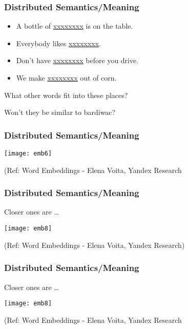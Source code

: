 \begin{frame}[fragile]\frametitle{Distributed Semantics/Meaning}
\begin{itemize}
\item  A bottle of \underline{xxxxxxxx} is on the table. 
\item  Everybody likes \underline{xxxxxxxx}.
\item  Don’t have \underline{xxxxxxxx} before you drive. 
\item  We make \underline{xxxxxxxx}  out of corn. 

\end{itemize}

What other words fit into these places? 

Won't they be similar to bardiwac?
\end{frame}

\begin{frame}[fragile]\frametitle{Distributed Semantics/Meaning}
\begin{center}
\texttt{[image: emb6]}
\end{center}

{\tiny (Ref: Word Embeddings - Elena Voita, Yandex Research}
\end{frame}



\begin{frame}[fragile]\frametitle{Distributed Semantics/Meaning}
Closer ones are \ldots

\begin{center}
\texttt{[image: emb8]}
\end{center}

{\tiny (Ref: Word Embeddings - Elena Voita, Yandex Research)}
\end{frame}

\begin{frame}[fragile]\frametitle{Distributed Semantics/Meaning}
Closer ones are \ldots

\begin{center}
\texttt{[image: emb8]}
\end{center}

{\tiny (Ref: Word Embeddings - Elena Voita, Yandex Research}
\end{frame}

